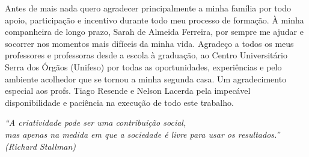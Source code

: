 \documentclass[
	12pt,				%
	openright,			%
	oneside,			%
	a4paper,			%
	chapter=TITLE,		%
	section=TITLE,		%
	subsection=TITLE,	%
	subsubsection=TITLE,%
	english,			%
	brazil				%
	]{abntex2}
\theoremstyle{definition}
\begin{document}
\begin{agradecimentos}

Antes de mais nada quero agradecer principalmente a minha família por todo apoio, participação e incentivo durante todo meu processo de formação. À minha companheira de longo prazo, Sarah de Almeida Ferreira, por sempre me ajudar e socorrer nos momentos mais difíceis da minha vida. Agradeço a todos os meus professores e professoras desde a escola à graduação, ao Centro Universitário Serra dos Órgãos (Unifeso) por todas as oportunidades, experiências e pelo ambiente acolhedor que se tornou a minha segunda casa. Um agradecimento especial aos profs. Tiago Resende e Nelson Lacerda pela impecável disponibilidade e paciência na execução de todo este trabalho.


\end{agradecimentos}



\begin{epigrafe}
    \vspace*{\fill}
	\begin{flushright}
		\textit{``A criatividade pode ser uma contribuição social, \\ mas apenas na medida em que a sociedade é livre para usar os resultados.''\\
		(Richard Stallman)}
	\end{flushright}
\end{epigrafe}

\end{document}
